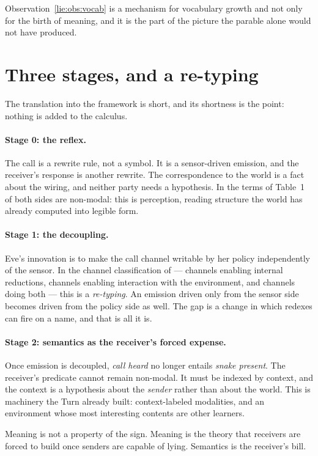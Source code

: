 Observation~\ref{lie:obs:vocab} is a mechanism for vocabulary growth and not
only for the birth of meaning, and it is the part of the picture the parable
alone would not have produced.

\section{Three stages, and a re-typing}
\label{sec:stages}

The translation into the framework is short, and its shortness is the point:
nothing is added to the calculus.

\paragraph{Stage 0: the reflex.} The call is a rewrite rule, not a symbol. It is
a sensor-driven emission, and the receiver's response is another rewrite. The
correspondence to the world is a fact about the wiring, and neither party needs a
hypothesis. In the terms of Table~1 of \chSci both sides are non-modal: this is
perception, reading structure the world has already computed into legible form.

\paragraph{Stage 1: the decoupling.} Eve's innovation is to make the call channel
writable by her policy independently of the sensor. In the channel classification
of \chSci --- channels enabling internal reductions, channels enabling
interaction with the environment, and channels doing both --- this is a
\emph{re-typing}. An emission driven only from the sensor side becomes driven
from the policy side as well. The gap is a change in which redexes can fire on a
name, and that is all it is.

\paragraph{Stage 2: semantics as the receiver's forced expense.} Once emission is
decoupled, \emph{call heard} no longer entails \emph{snake present}. The
receiver's predicate cannot remain non-modal. It must be indexed by context, and
the context is a hypothesis about the \emph{sender} rather than about the world.
This is machinery the Turn already built: context-labeled modalities, and an
environment whose most interesting contents are other learners.

\begin{observation}
\label{lie:obs:thesis}
Meaning is not a property of the sign. Meaning is the theory that receivers are
forced to build once senders are capable of lying. Semantics is the receiver's
bill.
\end{observation}

